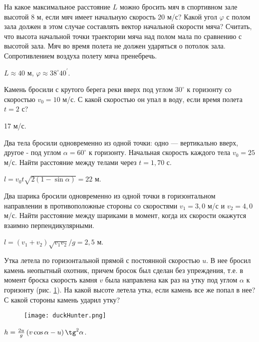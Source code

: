 \begin{ex} %
На какое максимальное расстояние $L$ можно бросить мяч в спортивном зале высотой 8 м, если мяч имеет начальную скорость 20 м/с? Какой угол $\varphi$ с полом зала должен в этом случае составлять вектор начальной скорости мяча? Считать, что высота начальной точки траектории мяча над полом мала по сравнению с высотой зала. Мяч во время полета не должен ударяться о потолок зала. Сопротивлением воздуха полету мяча пренебречь.
\begin{ans}
$L \approx 40$ м, $\varphi \approx 38^{\circ}40^\prime$.
\end{ans}
\end{ex}	

\begin{ex} %
Камень бросили с крутого берега реки вверх под углом $30^{\circ}$ к горизонту со скоростью $v_0 = 10$ м/с. С какой скоростью он упал в воду, если время полета $t = 2$ с?
\begin{ans}
17 м/с.
\end{ans}
\end{ex}	

\begin{ex} %
Два тела бросили одновременно из одной точки: одно — вертикально вверх, другое - под углом $\alpha = 60^{\circ}$ к горизонту. Начальная скорость каждого тела $v_0 = 25$ м/с. Найти расстояние между телами через $t = 1,70$ с.
\begin{ans}
$l = v_0 t \sqrt{2(1-\sin \alpha)} = 22$ м.
\end{ans}
\end{ex}	

\begin{ex} %
Два шарика бросили одновременно из одной точки в горизонтальном направлении в противоположные стороны со скоростями $v_1 = 3,0$ м/с и $v_2 = 4,0$ м/с. Найти расстояние между шариками в момент, когда их скорости окажутся взаимно перпендикулярными.
\begin{ans}
$l = (v_1 + v_2)\sqrt{v_1 v_2}/g = 2,5$ м.
\end{ans}
\end{ex}	

\begin{ex} %
Утка летела по горизонтальной прямой с постоянной скоростью $u$. В нее бросил камень неопытный охотник, причем бросок был сделан без упреждения, т.е. в момент броска скорость камня $v$ была направлена как раз на утку под углом $\alpha$ к горизонту (рис. \ref{duckHunter}). На какой высоте летела утка, если камень все же попал в нее? С какой стороны камень ударил утку?
\begin{figure}
\centering
\texttt{[image: duckHunter.png]}
\caption{}
\label{duckHunter}
\end{figure}
\begin{ans}
$h = \frac{2u}{g}\left( v \cos \alpha - u \right) \tg^2 \alpha$.
\end{ans}
\end{ex}

